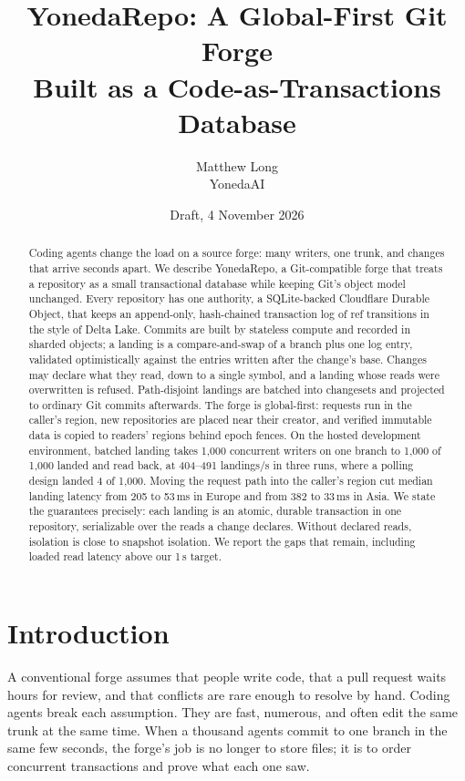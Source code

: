 \documentclass[11pt]{article}
\title{YonedaRepo: A Global-First Git Forge\\Built as a Code-as-Transactions Database}
\author{Matthew Long\\YonedaAI}
\date{Draft, 4 November 2026}
\begin{document}
\maketitle

\begin{abstract}
Coding agents change the load on a source forge: many writers, one trunk, and changes
that arrive seconds apart. We describe YonedaRepo, a Git-compatible forge that treats a
repository as a small transactional database while keeping Git's object model unchanged.
Every repository has one authority, a SQLite-backed Cloudflare Durable Object, that keeps
an append-only, hash-chained transaction log of ref transitions in the style of Delta
Lake. Commits are built by stateless compute and recorded in sharded objects; a landing
is a compare-and-swap of a branch plus one log entry, validated optimistically against
the entries written after the change's base. Changes may declare what they read, down to
a single symbol, and a landing whose reads were overwritten is refused. Path-disjoint
landings are batched into changesets and projected to ordinary Git commits afterwards.
The forge is global-first: requests run in the caller's region, new repositories are
placed near their creator, and verified immutable data is copied to readers' regions
behind epoch fences.
On the hosted development environment, batched landing takes 1,000 concurrent writers
on one branch to 1,000 of 1,000 landed and read back, at 404--491 landings/s in three
runs, where a polling design landed 4 of 1,000. Moving the request path into the
caller's region cut median landing latency from 205 to 53\,ms in Europe and from 382
to 33\,ms in Asia. We state the guarantees precisely: each landing is an atomic,
durable transaction in one repository, serializable over the reads a change declares.
Without declared reads, isolation is close to snapshot isolation. We report the gaps
that remain, including loaded read latency above our 1\,s target.
\end{abstract}

\section{Introduction}

A conventional forge assumes that people write code, that a pull request waits hours
for review, and that conflicts are rare enough to resolve by hand. Coding agents break
each assumption. They are fast, numerous, and often edit the same trunk at the same
time. When a thousand agents commit to one branch in the same few seconds, the forge's
job is no longer to store files; it is to order concurrent transactions and prove what
each one saw.
\end{document}
